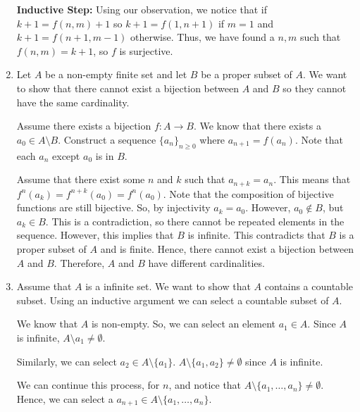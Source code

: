 \documentclass[12pt]{article}
\begin{document}
\begin{enumerate}[start=1,label={\bfseries Problem \arabic*:},leftmargin=1in]
    \textbf{Inductive Step:} Using our observation, we notice that if $k + 1 = f(n, m) + 1$ so $k + 1 = f(1, n+1)$ if $m = 1$ and $k + 1 = f(n+1, m-1)$ otherwise.
    Thus, we have found a $n, m$ such that $f(n, m) = k + 1$, so $f$ is surjective. 


    \item Let $A$ be a non-empty finite set and let $B$ be a proper subset of $A$. 
    We want to show that there cannot exist a bijection between $A$ and $B$ so they cannot have the same cardinality. 

    Assume there exists a bijection $f: A \rightarrow B$. We know that there exists a $a_{0} \in A \setminus B$. 
    Construct a sequence $\{a_{n} \}_{n\geq 0}$ where $a_{n+1} = f(a_{n})$. Note that each $a_{n}$ except $a_{0}$ is in $B$.   

    Assume that there exist some $n$ and $k$ such that $a_{n+k} = a_{n}$. This means that $f^{n}(a_{k}) = f^{n+k}(a_{0}) = f^{n}(a_{0})$. Note that the composition of bijective functions are still bijective. 
    So, by injectivity $a_{k} = a_{0}$. However, $a_{0} \not \in B$, but $a_{k} \in B$. This is a contradiction, so there cannot be repeated elements in the sequence. However, this implies that $B$ is infinite. This contradicts that $B$ is a proper subset of $A$ and is finite. Hence, there cannot exist a bijection between $A$ and $B$. Therefore, $A$ and $B$ have different cardinalities. 

    \item Assume that $A$ is a infinite set. We want to show that $A$ contains a countable subset. 
    Using an inductive argument we can select a countable subset of $A$.

    We know that $A$ is non-empty. So, we can select an element $a_{1} \in A$.
    Since $A$ is infinite, $A \setminus a_{1} \neq \emptyset$. 

    Similarly, we can select $a_{2} \in A \setminus \{ a_{1} \}$. $A \setminus \{ a_{1}, a_{2} \} \neq \emptyset$ since $A$ is infinite.

    We can continue this process, for $n$, and notice that $A \setminus \{ a_{1}, \dots, a_{n}\} \neq \emptyset$. Hence, we can select a $a_{n+1} \in A \setminus \{ a_{1}, \dots, a_{n} \}$.
    
\end{enumerate}
\end{document}
